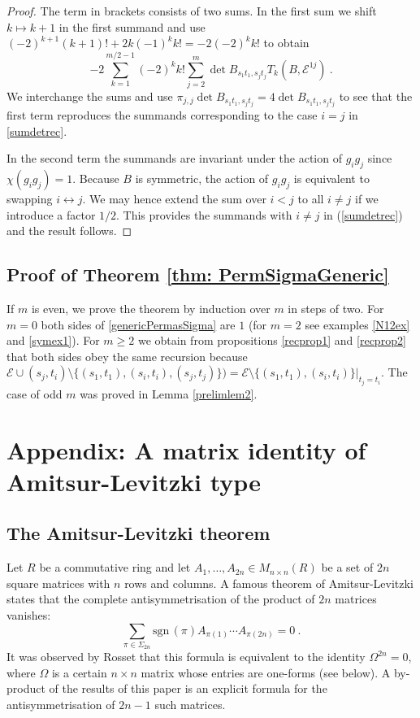 \documentclass[10pt]{amsart}
\newcommand{\sE}{\mathcal{E}}
\newcommand{\sgn}{\mathrm{sgn}\,}
\theoremstyle{plain}
\newcommand{\0}{\color{blue}{\mathsf{0}}}
\begin{document}
\begin{proof}
The term in brackets  consists of two sums. In the first sum we shift $k\mapsto k+1$ in the first summand and use $(-2)^{k+1}(k+1)!+2k(-1)^kk!=-2(-2)^kk!$ to obtain
$$
-2\sum_{k=1}^{m/2-1}(-2)^kk!\sum_{j=2}^m\det B_{s_1t_1,s_jt_j}T_k(B,\sE^{1j})\ .
$$
We interchange the sums and use $\pi_{j,j}\det B_{s_1t_1,s_jt_j}=4\det B_{s_1t_1,s_jt_j}$
to see that the first term reproduces the summands corresponding to the case $i=j$   in \eqref{sumdetrec}.

In the second term the summands are invariant under the action of $g_ig_j$ since $\chi(g_ig_j)=1$. Because $B$ is symmetric, the action of $g_ig_j$ is equivalent to swapping
$i\leftrightarrow j$. We may hence extend the sum over $i<j$ to all $i\neq j$ if we introduce
a factor $1/2$. This provides
the summands with $i\neq j$ in (\ref{sumdetrec}) and the result follows.
\end{proof}

\subsection{Proof of Theorem \ref{thm: PermSigmaGeneric}}
If $m$ is even, we prove the theorem by induction over $m$ in steps of two.
For $m=0$ both sides of \eqref{genericPermasSigma} are $1$ (for $m=2$ see examples \ref{N12ex} and
\ref{symex1}).
For $m\geq2$ we obtain from propositions \ref{recprop1} and \ref{recprop2}
that both sides obey the same recursion because $\sE\cup(s_j,t_i)\setminus\{(s_1,t_1),(s_i,t_i),(s_j,t_j)\})=\sE\setminus \{(s_1,t_1),(s_i,t_i)\}|_{t_j=t_i}$. The case of odd  $m$  was proved in Lemma \ref{prelimlem2}.


\section{Appendix: A matrix identity of Amitsur-Levitzki type}


\subsection{The Amitsur-Levitzki theorem} Let $R$ be a commutative ring and let $A_1,\ldots, A_{2n} \in M_{n\times n}(R)$ be a set of $2 n$ square matrices with $n$ rows and columns.  A famous theorem of Amitsur-Levitzki states that the complete antisymmetrisation of
 the product of $2n$ matrices vanishes: 
\begin{equation}
    \sum_{\pi \in \Sigma_{2n}} \sgn(\pi) A_{\pi(1)}\cdots A_{\pi(2n)} = 0 \ . 
\end{equation}
It was observed by Rosset  \cite{Rosset76, Procesi}  that this formula is equivalent  to the identity $\Omega^{2n}=0$, where $\Omega$ is a certain  $n\times n$ matrix whose entries are one-forms (see below). 
A by-product of the results of this paper is an explicit formula for the antisymmetrisation of $2n-1$ such matrices. 
\end{document}
